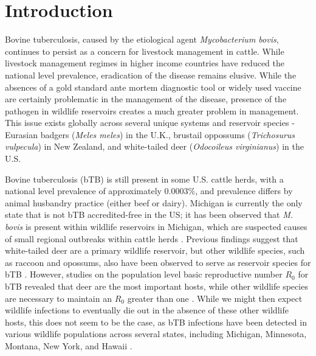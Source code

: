 \documentclass[number,preprint,review,12pt]{elsarticle}
\begin{document}
\section{Introduction}
Bovine tuberculosis, caused by the etiological agent \textit{Mycobacterium bovis}, continues to persist as a concern for livestock management in cattle. While livestock management regimes in higher income countries have reduced the national level prevalence, eradication of the disease remains elusive. While the absences of a gold standard ante mortem diagnostic tool or widely used vaccine are certainly problematic in the management of the disease, presence of the pathogen in wildlife reservoirs creates a much greater problem in management. This issue exists globally across several unique systems and reservoir species - Eurasian badgers (\textit{Meles meles}) in the U.K., brustail oppossums (\textit{Trichosurus vulpecula}) in New Zealand, and white-tailed deer (\textit{Odocoileus virginianus}) in the U.S. 

Bovine tuberculosis (bTB) is still present in some U.S. cattle herds, with a national level prevalence of approximately 0.0003$\%$, and prevalence differs by animal husbandry practice (either beef or dairy)\citep{USDA2009}.  Michigan is currently the only state that is not bTB accredited-free in the US; it has been observed that \textit{M. bovis} is present within wildlife reservoirs in Michigan, which are suspected causes of small regional outbreaks within cattle herds \citep{miller2013}. Previous findings suggest that white-tailed deer are a primary wildlife reservoir, but other wildlife species, such as raccoon and opossums, also have been observed to serve as reservoir species for bTB \citep{Lavelle2016}. However, studies on the population level basic reproductive number $R_0$ for bTB revealed that deer are the most important hosts, while other wildlife species are necessary to maintain an $R_0$ greater than one \citep{Wilber2019}. While we might then expect wildlife infections to eventually die out in the absence of these other wildlife hosts, this does not seem to be the case, as bTB infections have been detected in various wildlife populations across several states, including Michigan, Minnesota, Montana, New York, and Hawaii \citep{miller2013}.
\end{document}
